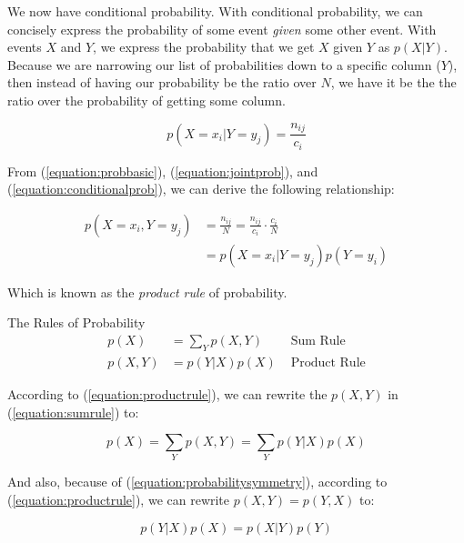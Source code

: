 \documentclass{tufte-handout}
\begin{document}
We now have conditional probability. With conditional probability, we can
concisely express the probability of some event \emph{given} some other event.
With events $X$ and $Y$, we express the probability that we get $X$ given $Y$ as
$p(X|Y)$. Because we are narrowing our list of probabilities down to a specific
column ($Y$), then instead of having our probability be the ratio over $N$, we
have it be the the ratio over the probability of getting some column.

\begin{equation} \label{equation:conditionalprob}
  p(X = x_i | Y = y_j) = \frac{n_{ij}}{c_i}
\end{equation}

From (\ref{equation:probbasic}), (\ref{equation:jointprob}), and
(\ref{equation:conditionalprob}), we can derive the following relationship:

\begin{equation}
  \begin{aligned}
    p(X = x_i , Y = y_j) &= \frac{n_{ij}}{N} = \frac{n_{ij}}{c_i} \cdot \frac{c_i}{N} \\
                         & = p(X = x_i | Y = y_j)p(Y = y_i)
  \end{aligned}
\end{equation}

Which is known as the \emph{product rule} of probability.

\begin{tcolorbox}
  The Rules of Probability
  \begin{align}
    p(X) &= \sum\limits_{Y}p(X, Y) & \text{    Sum Rule} \label{equation:sumrule}\\
    p(X, Y) &= p(Y|X)p(X) & \text{    Product Rule} \label{equation:productrule}
  \end{align}
\end{tcolorbox}

According to (\ref{equation:productrule}), we can rewrite the $p(X, Y)$ in
(\ref{equation:sumrule}) to:

\begin{equation}
  p(X) = \sum\limits_{Y}p(X, Y) = \sum\limits_{Y}p(Y|X)p(X)
\end{equation}

And also, because of (\ref{equation:probabilitysymmetry}), according to
(\ref{equation:productrule}), we can rewrite $p(X, Y) = p(Y, X)$ to:

\begin{equation}\label{equation:alternatesymmetry}
  p(Y|X)p(X) = p(X|Y)p(Y)
\end{equation}
\end{document}
